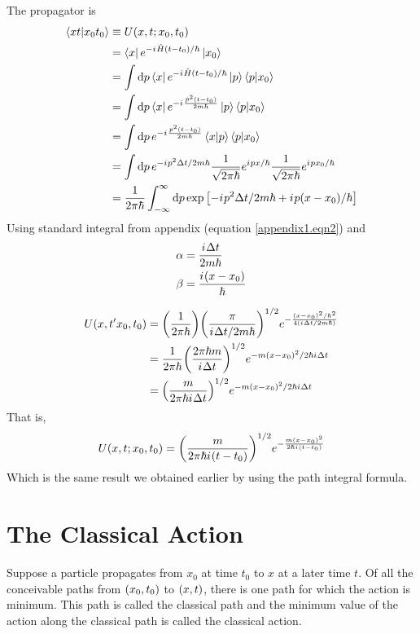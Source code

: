 	
	The propagator is 
	\begin{align}
		\braket{x t}{x_0 t_0} &\equiv U\qty(x, t; x_0, t_0) \\
		&= \bra{x} e^{-{i\mkern1mu} \hat{H}(t-t_0)/\hbar}\ket{x_0} \\
		&= \int \dd{p} \bra{x} e^{-{i\mkern1mu} \hat{H}(t-t_0)/\hbar}\ket{p}\braket{p}{x_0} \\
		&= \int \dd{p} \bra{x} e^{-{i\mkern1mu} \frac{\hat{p}^2\qty(t-t_0)}{2 m \hbar}}\ket{p}\braket{p}{x_0} \\
		&= \int \dd{p} e^{-{i\mkern1mu} \frac{p^2\qty(t-t_0)}{2 m \hbar}}\braket{x}{p}\braket{p}{x_0} \\
		&= \int \dd{p} e^{-{i\mkern1mu} p^2 \Delta t /2 m \hbar} \frac{1}{\sqrt{2\pi\hbar}} e^{{i\mkern1mu} p x/\hbar} \frac{1}{\sqrt{2\pi\hbar}} e^{{i\mkern1mu} p x_0/\hbar} \\
		&= \frac{1}{2\pi\hbar} \int_{-\infty}^{\infty} \dd{p} \exp\qty[-{i\mkern1mu} p^2 \Delta t/2 m \hbar + {i\mkern1mu} p \qty(x-x_0)/\hbar]
	\end{align}
	Using standard integral from appendix (equation \ref{appendix1.eqn2}) and 
	\begin{align}
		\alpha &= \frac{{i\mkern1mu} \Delta t}{2 m \hbar} \\
		\beta &= \frac{{i\mkern1mu} \qty(x-x_0)}{\hbar}
	\end{align}
	
	\begin{align*}
		U\qty(x,t'x_0,t_0) 
		&= \qty(\frac{1}{2\pi \hbar}) \qty(\frac{\pi}{{i\mkern1mu} \Delta t / 2 m \hbar})^{1/2} e^{-\frac{\qty(x-x_0)^2/\hbar^2}{4\qty({i\mkern1mu} \Delta t /2 m \hbar)}} \\
		&= \frac{1}{2\pi \hbar} \qty(\frac{2\pi \hbar m}{{i\mkern1mu} \Delta t})^{1/2} e^{-m\qty(x-x_0)^2/2 \hbar {i\mkern1mu} \Delta t} \\
		&= \qty(\frac{m}{2\pi \hbar {i\mkern1mu} \Delta t})^{1/2} e^{-m\qty(x-x_0)^2/2 \hbar {i\mkern1mu} \Delta t} 
	\end{align*}
	That is,
	\begin{equation}
		U\qty(x,t;x_0,t_0) = \qty(\frac{m}{2\pi\hbar {i\mkern1mu} \qty(t-t_0)})^{1/2} e^{-\frac{m\qty(x-x_0)^2}{2\hbar {i\mkern1mu} \qty(t-t_0)}}
	\end{equation}
	Which is the same result we obtained earlier by using the path integral formula.
	
	
	\section{The Classical Action}
		Suppose a particle propagates from $x_0$ at time $t_0$ to $x$ at a later time $t$. Of all the conceivable paths from $\qty(x_0, t_0)$ to $\qty(x,t)$, there is one path for which the action is minimum. This path is called the classical path and the minimum value of the action along the classical path is called the classical action.
		
